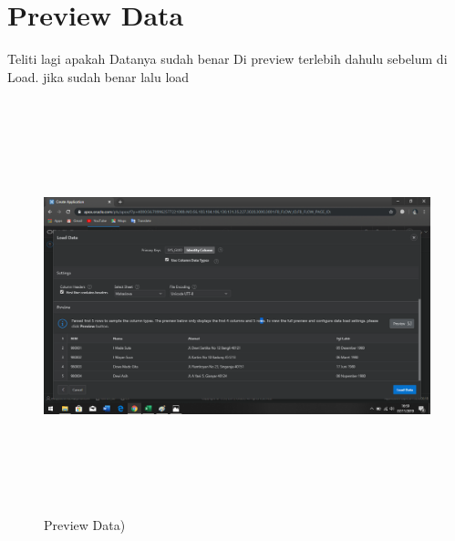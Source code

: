 \documentclass[a4, 13pt]{article}
\begin{document}
      \section{Preview Data}
     Teliti lagi apakah Datanya sudah benar Di preview terlebih dahulu sebelum di Load. jika sudah benar lalu load
    \begin{figure}[!htbp]
        \centering
        \includegraphics[width=16cm, height=12cm]{pictures/D.png}
        \caption{Preview Data)}
        \label{fig:my_label}
    \end{figure}
    \vspace{2cm}
    
\end{document}
